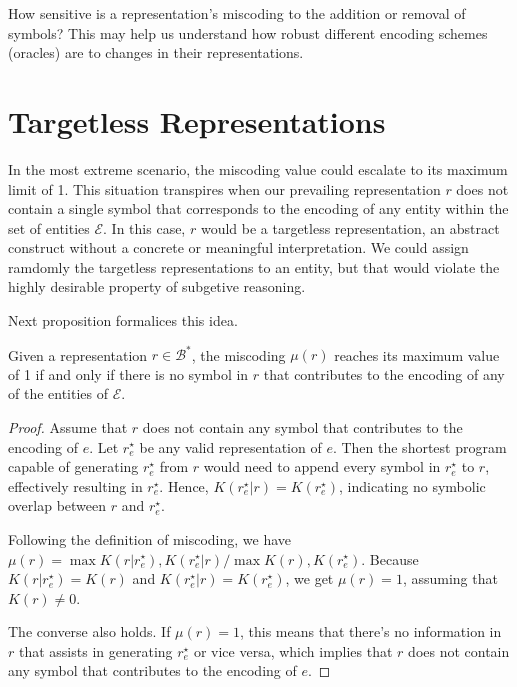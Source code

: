 {\color{red} How sensitive is a representation's miscoding to the addition or removal of symbols? This may help us understand how robust different encoding schemes (oracles) are to changes in their representations.}

%
%

\section{Targetless Representations}

In the most extreme scenario, the miscoding value could escalate to its maximum limit of 1. This situation transpires when our prevailing representation $r$ does not contain a single symbol that corresponds to the encoding of any entity within the set of entities $\mathcal{E}$. In this case, $r$ would be a targetless representation, an abstract construct without a concrete or meaningful interpretation. We could assign ramdomly the targetless representations to an entity, but that would violate the highly desirable property of subgetive reasoning.

Next proposition formalices this idea.

\begin{proposition}
\label{prop:miscoding_upper_bound}
Given a representation $r \in \mathcal{B}^\ast$, the miscoding $\mu(r)$ reaches its maximum value of 1 if and only if there is no symbol in $r$ that contributes to the encoding of any of the entities of $\mathcal{E}$.
\end{proposition}
\begin{proof}
Assume that $r$ does not contain any symbol that contributes to the encoding of $e$. Let $r^\star_e$ be any valid representation of $e$. Then the shortest program capable of generating $r^\star_e$ from $r$ would need to append every symbol in $r^\star_e$ to $r$, effectively resulting in $r^\star_e$. Hence, $K(r^\star_e | r) = K(r^\star_e)$, indicating no symbolic overlap between $r$ and $r^\star_e$.

Following the definition of miscoding, we have $\mu(r) = \max{ K(r | r^\star_e), K(r^\star_e | r) } / \max{K(r), K(r^\star_e)}$. Because $K(r | r^\star_e) = K(r)$ and $K(r^\star_e | r) = K(r^\star_e)$, we get $\mu(r) = 1$, assuming that $K(r) \neq 0$.

The converse also holds. If $\mu(r) = 1$, this means that there's no information in $r$ that assists in generating $r^\star_e$ or vice versa, which implies that $r$ does not contain any symbol that contributes to the encoding of $e$.
\end{proof}

